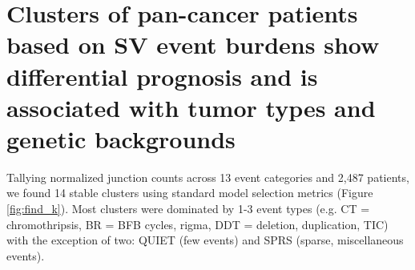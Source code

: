 \documentclass[phd,tocprelim]{cornell}
\renewcommand{\caption}[1]{\singlespacing\hangcaption{#1}\normalspacing}
\begin{document}
\section{Clusters of pan-cancer patients based on SV event burdens show differential prognosis and is associated with tumor types and genetic backgrounds}

\begin{figure}[!ht]
\end{figure}



Tallying normalized junction counts across 13 event categories and 2,487 patients, we found 14 stable clusters using standard model selection metrics (Figure \ref{fig:find_k}). Most clusters were dominated by 1-3 event types (e.g. CT = chromothripsis, BR = BFB cycles, rigma, DDT = deletion, duplication, TIC) with the exception of two: QUIET (few events) and SPRS (sparse, miscellaneous events).
\end{document}
